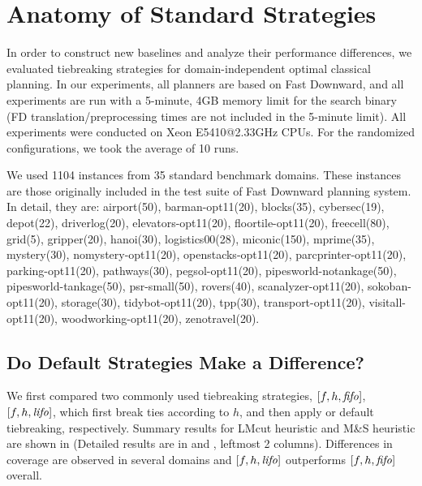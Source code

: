 \section{Anatomy of Standard Strategies}
\label{sec:eval-common-strategies}

In order to construct new baselines and analyze their performance differences,
we evaluated tiebreaking strategies for domain-independent optimal
classical planning.  In our experiments, all planners are based on Fast
Downward, and all experiments are run with a 5-minute,
4GB memory limit for the search binary (FD translation/preprocessing
times are not included in the 5-minute limit).  All experiments were
conducted on Xeon E5410@2.33GHz CPUs. For the randomized configurations, we took the average of 10 runs.

We used 1104 instances from 35 standard benchmark domains. These
instances are those originally included in the test suite of Fast
Downward planning system. In detail, they are: airport(50),
barman-opt11(20), blocks(35), cybersec(19), depot(22), driverlog(20),
elevators-opt11(20), floortile-opt11(20), freecell(80), grid(5),
gripper(20), hanoi(30), logistics00(28), miconic(150), mprime(35),
mystery(30), nomystery-opt11(20), openstacks-opt11(20),
parcprinter-opt11(20), parking-opt11(20), pathways(30),
pegsol-opt11(20), pipesworld-notankage(50), pipesworld-tankage(50),
psr-small(50), rovers(40), scanalyzer-opt11(20), sokoban-opt11(20),
storage(30), tidybot-opt11(20), tpp(30), transport-opt11(20),
visitall-opt11(20), woodworking-opt11(20), zenotravel(20).

\subsection{Do Default Strategies Make a Difference?}

We first compared two commonly used tiebreaking strategies, $[f,h,{\text{\textit{fifo}}}]$, $[f,h,{\text{\textit{lifo}}}]$, which
first break ties according to $h$, and then apply \fifo or \lifo
default tiebreaking, respectively.
Summary results for LMcut heuristic \cite{Helmert2009} and M\&S heuristic \cite{HelmertHHN14} are
shown in  (Detailed results are in  and , leftmost 2 columns).
Differences in coverage are observed in several domains and $[f,h,{\text{\textit{lifo}}}]$ outperforms $[f,h,{\text{\textit{fifo}}}]$ overall.

